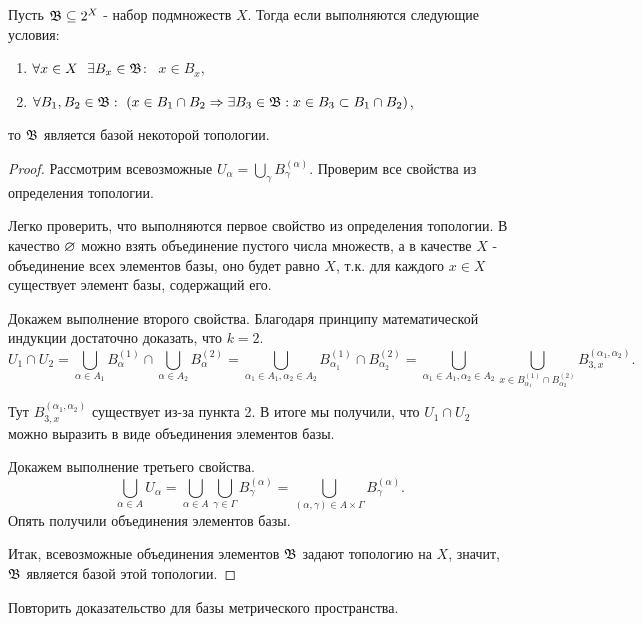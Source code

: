 \begin{lemma}
    Пусть $\mathfrak{B} \subseteq 2^X$ - набор подмножеств $X$. Тогда если выполняются следующие условия:
    \begin{enumerate}
        \item $\forall x \in X \ \ \exists B_x \in \mathfrak{B} $: \ $x \in B_x$,
        \item $\forall B_1, B_2 \in \mathfrak{B}: \ (x \in B_1 \cap B_2 \Rightarrow \exists B_3 \in \mathfrak{B} : x \in B_3 \subset B_1 \cap B_2)$, 
    \end{enumerate}
    то $\mathfrak{B}$ является базой некоторой топологии.
\end{lemma}
\begin{proof} %
    Рассмотрим всевозможные $U_{\alpha} = \bigcup_{\gamma} B_{\gamma}^{(\alpha)}$. Проверим все свойства из определения топологии.

    Легко проверить, что выполняются первое свойство из определения топологии. В качество $\varnothing$ можно взять объединение пустого числа множеств, а в качестве $X$ - объединение всех элементов базы, оно будет равно $X$, т.к. для каждого $x \in X$ существует элемент базы, содержащий его.

    Докажем выполнение второго свойства. Благодаря принципу математической индукции достаточно доказать, что $k = 2$.
    \[
        U_1 \cap U_2 = \bigcup_{\alpha \in A_1} B_{\alpha}^{(1)} \cap \bigcup_{\alpha \in A_2} B_{\alpha}^{(2)} = \bigcup_{\alpha_1 \in A_1, \alpha_2 \in A_2} B_{\alpha_1}^{(1)} \cap B_{\alpha_2}^{(2)} = \bigcup_{\alpha_1 \in A_1, \alpha_2 \in A_2} \bigcup_{x \in B_{\alpha_1}^{(1)} \cap B_{\alpha_2}^{(2)}} B_{3, x}^{(\alpha_1, \alpha_2)}.
    \]

    Тут $B_{3, x}^{(\alpha_1, \alpha_2)}$ существует из-за пункта 2. В итоге мы получили, что $U_1 \cap U_2$ можно выразить в виде объединения элементов базы.
    
    Докажем выполнение третьего свойства.
    \[
        \bigcup_{\alpha \in A} U_{\alpha} = \bigcup_{\alpha \in A} \bigcup_{\gamma \in \Gamma} B_{\gamma}^{(\alpha)} = \bigcup_{(\alpha, \gamma) \in A \times \Gamma} B_{\gamma}^{(\alpha)}.
    \]
    Опять получили объединения элементов базы.

    Итак, всевозможные объединения элементов $\mathfrak{B}$ задают топологию на $X$, значит, $\mathfrak{B}$ является базой этой топологии.
\end{proof}

\begin{exercise}
    Повторить доказательство для базы метрического пространства.
\end{exercise}

